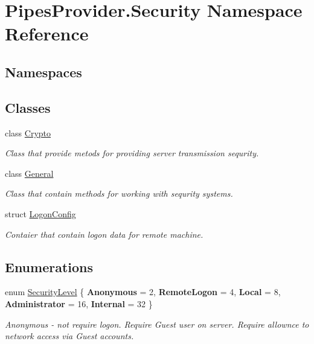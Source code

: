 \hypertarget{namespace_pipes_provider_1_1_security}{}\section{Pipes\+Provider.\+Security Namespace Reference}
\label{namespace_pipes_provider_1_1_security}
\subsection*{Namespaces}
\begin{DoxyCompactItemize}
\end{DoxyCompactItemize}
\subsection*{Classes}
\begin{DoxyCompactItemize}
\item 
class \mbox{\hyperlink{class_pipes_provider_1_1_security_1_1_crypto}{Crypto}}
\begin{DoxyCompactList}\small\item\em Class that provide metods for providing server transmission sequrity. \end{DoxyCompactList}\item 
class \mbox{\hyperlink{class_pipes_provider_1_1_security_1_1_general}{General}}
\begin{DoxyCompactList}\small\item\em Class that contain methods for working with sequrity systems. \end{DoxyCompactList}\item 
struct \mbox{\hyperlink{struct_pipes_provider_1_1_security_1_1_logon_config}{Logon\+Config}}
\begin{DoxyCompactList}\small\item\em Contaier that contain logon data for remote machine. \end{DoxyCompactList}\end{DoxyCompactItemize}
\subsection*{Enumerations}
\begin{DoxyCompactItemize}
\item 
enum \mbox{\hyperlink{namespace_pipes_provider_1_1_security_a1a6020eca1c661a6f7140e8260502d7e}{Security\+Level}} \{ \newline
{\bfseries Anonymous} = 2, 
{\bfseries Remote\+Logon} = 4, 
{\bfseries Local} = 8, 
{\bfseries Administrator} = 16, 
\newline
{\bfseries Internal} = 32
 \}
\begin{DoxyCompactList}\small\item\em Anonymous -\/ not require logon. Require Guest user on server. Require allownce to network access via Guest accounts. \end{DoxyCompactList}\end{DoxyCompactItemize}


